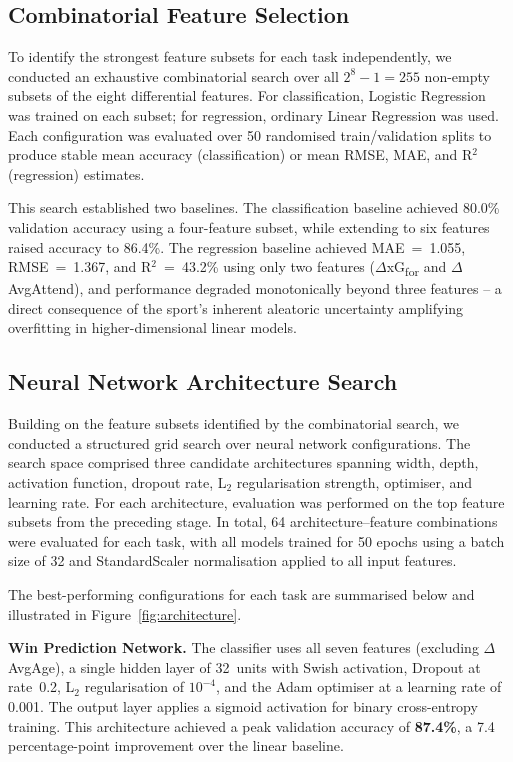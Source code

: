 \documentclass[a4paper,twoside]{article}
\begin{document}
\subsection{Combinatorial Feature Selection}

To identify the strongest feature subsets for each task independently, we conducted an exhaustive combinatorial search over all $2^{8} - 1 = 255$ non-empty subsets of the eight differential features.
For classification, Logistic Regression was trained on each subset; for regression, ordinary Linear Regression was used.
Each configuration was evaluated over 50 randomised train/validation splits to produce stable mean accuracy (classification) or mean RMSE, MAE, and R$^{2}$ (regression) estimates.

This search established two baselines.
The classification baseline achieved 80.0\% validation accuracy using a four-feature subset, while extending to six features raised accuracy to 86.4\%.
The regression baseline achieved MAE~=~1.055, RMSE~=~1.367, and R$^{2}$~=~43.2\% using only two features ($\Delta$xG\textsubscript{for} and $\Delta$AvgAttend), and performance degraded monotonically beyond three features -- a direct consequence of the sport's inherent aleatoric uncertainty amplifying overfitting in higher-dimensional linear models.

\subsection{Neural Network Architecture Search}

Building on the feature subsets identified by the combinatorial search, we conducted a structured grid search over neural network configurations.
The search space comprised three candidate architectures spanning width, depth, activation function, dropout rate, L$_{2}$ regularisation strength, optimiser, and learning rate.
For each architecture, evaluation was performed on the top feature subsets from the preceding stage.
In total, 64 architecture--feature combinations were evaluated for each task, with all models trained for 50 epochs using a batch size of 32 and StandardScaler normalisation applied to all input features.

The best-performing configurations for each task are summarised below and illustrated in Figure~\ref{fig:architecture}.

\noindent\textbf{Win Prediction Network.}
The classifier uses all seven features (excluding $\Delta$AvgAge), a single hidden layer of 32~units with Swish activation, Dropout at rate~0.2, L$_{2}$ regularisation of $10^{-4}$, and the Adam optimiser at a learning rate of 0.001.
The output layer applies a sigmoid activation for binary cross-entropy training.
This architecture achieved a peak validation accuracy of \textbf{87.4\%}, a 7.4 percentage-point improvement over the linear baseline.
\end{document}
